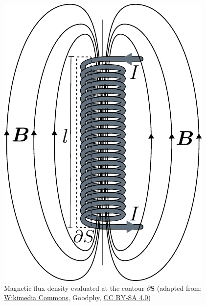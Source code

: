 \begin{frame}
\begin{columns}
\begin{column}{0.425\textwidth}
\begin{figure}
				\includegraphics[height=0.68\textheight]{fig/lec02/Solenoid_Ampere_law.pdf}
				\caption{Magnetic flux density evaluated at the contour $\partial \bm{S}$  (adapted from: \href{https://commons.wikimedia.org/wiki/File:Solenoid_and_Ampere_Law.png}{Wikimedia Commons}, Goodphy, \href{https://creativecommons.org/licenses/by-sa/4.0/deed.en}{CC BY-SA 4.0})}
			\end{figure}
		\end{column}
		\end{columns}
\end{frame}

